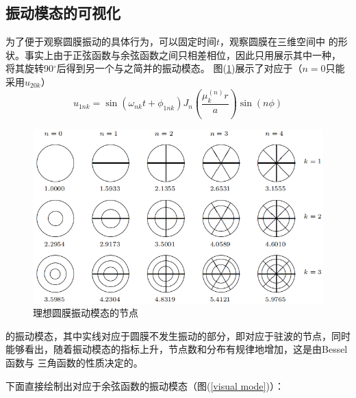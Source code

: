 \documentclass[a4paper]{ctexart}
\def\degree{$^{\circ}$}
\begin{document}
	\subsection{振动模态的可视化} 
	\par 
	为了便于观察圆膜振动的具体行为，可以固定时间$t$，观察圆膜在三维空间中
	的形状。事实上由于正弦函数与余弦函数之间只相差相位，因此只用展示其中一种，
	将其旋转90\degree 后得到另一个与之简并的振动模态。
	图(\ref{vib img})\cite{mmtoffering}展示了对应于（$n=0$只能采用$u_{20k}$）
	\begin{equation}
		u_{1nk} = \sin(\omega_{nk}t + \phi_{1nk}) 
				J_n\left(\frac{\mu_{k}^{(n)}r}{a}\right)\sin(n\phi)
	\end{equation}
	\begin{figure}[htbp]
		\includegraphics[scale=1]{vibration_mode_ideal.png}
		\centering
		\caption{理想圆膜振动模态的节点}
		\label{vib img}		
	\end{figure}
	的振动模态，其中实线对应于圆膜不发生振动的部分，即对应于驻波的节点，同时
	能够看出，随着振动模态的指标上升，节点数和分布有规律地增加，这是由Bessel函数与
	三角函数的性质决定的。
	\par 下面直接绘制出对应于余弦函数的振动模态（图(\ref{visual mode})）：
\end{document}
